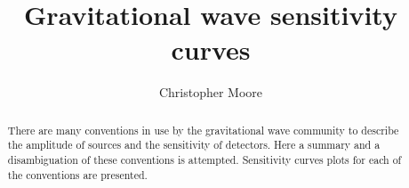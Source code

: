 \documentclass[fleqn,12pt]{iopart}
\begin{document}
\title{Gravitational wave sensitivity curves}
\author{Christopher Moore}
\address{Institute of Astronomy, Madingley Road, Cambridge, CB3 0HA, UK}

\begin{abstract}
There are many conventions in use by the gravitational wave community to describe the amplitude of sources and the sensitivity of detectors. Here a summary and a disambiguation of these conventions is attempted. Sensitivity curves plots for each of the conventions are presented.
\end{abstract}













\end{document}
